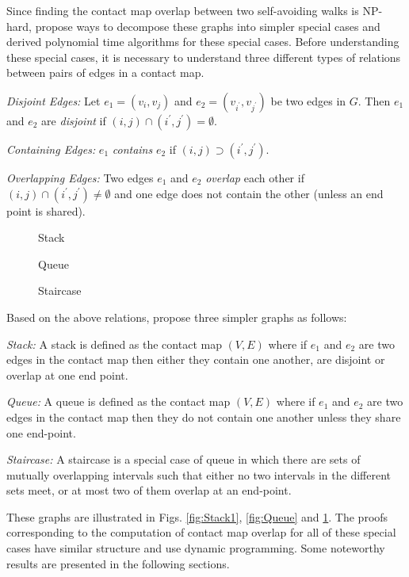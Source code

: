 Since finding the contact map overlap between two self-avoiding walks is NP-hard, \citet{goip99} propose ways to decompose these graphs into simpler special cases and derived polynomial time algorithms for these special cases. Before understanding these special cases, it is necessary to understand three different types of relations between pairs of edges in a contact map.
\begin{noindlist}
\item {\it Disjoint Edges:}  Let $e_1 = (v_i, v_j)$ and $e_2 = (v_{i^{\prime}}, v_{j^{\prime}})$ be two
edges in $G$. Then $e_1$ and $e_2$ are \emph{disjoint} if $(i,j) \cap (i^{\prime},j^{\prime}) = \emptyset$.
\item {\it Containing Edges:} $e_1$ \emph{contains} $e_2$ if  $(i,j) \supset (i^{\prime},j^{\prime})$.
\item {\it Overlapping Edges:} Two edges $e_1$ and $e_2$ \emph{overlap} each other if $(i,j) \cap (i^{\prime},j^{\prime}) \neq \emptyset$ and one edge does not contain the other (unless an end point is shared).
\end{noindlist}

\begin{figure}[htbp]
\begin{minipage}[b]{0.33\linewidth}
\centering
 
 \vspace{0.65cm}
 \caption{Stack}
 \label{fig:Stack1}
\end{minipage}
\begin{minipage}[b]{0.33\linewidth}
\centering
 
 \vspace{0.65cm}
 \caption{Queue}
 \label{fig:Queue}
\end{minipage}
\begin{minipage}[b]{0.33\linewidth}
\centering
 
 \vspace{0.65cm}
 \caption{Staircase}
 \label{fig:Staircase}
\end{minipage}
\end{figure}

Based on the above relations, \citet{goip99} propose three simpler graphs as follows:
\begin{noindlist}
\item {\it Stack:} A stack is defined as the contact map $(V,E)$ where if $e_1$ and $e_2$ are two edges in the contact map then either they contain one another, are disjoint or overlap at one end point.
\item {\it Queue:} A queue is defined as the contact map $(V,E)$ where if $e_1$ and $e_2$ are two edges in the contact map then they do not contain one another unless they share one end-point.
\item {\it Staircase:} A staircase is a special case of queue in which there are sets of mutually overlapping intervals such that either no two intervals in the different sets meet, or at most two of them overlap at an end-point.
\end{noindlist}
These graphs are illustrated in Figs. \ref{fig:Stack1}, \ref{fig:Queue} and \ref{fig:Staircase}. The proofs corresponding to the computation of contact map overlap for all of these special cases have similar structure and use dynamic programming. Some noteworthy results are presented in the following sections.

